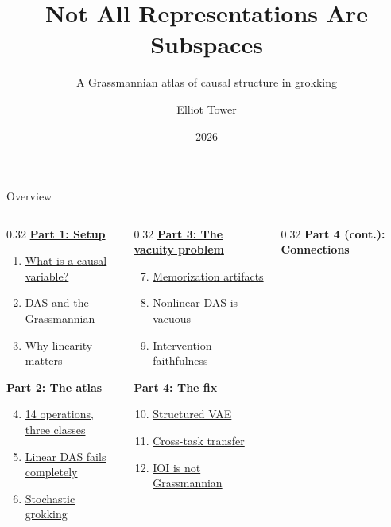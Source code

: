 \documentclass[aspectratio=169,11pt]{beamer}
\title{Not All Representations Are Subspaces}
\subtitle{A Grassmannian atlas of causal structure in grokking}
\author{Elliot Tower}
\date{2026}
\institute{}
\begin{document}
\maketitle

\begin{frame}{Overview}
\begin{columns}[T]
\begin{column}{0.32\textwidth}
\textbf{\hyperlink{part1}{Part 1: Setup}}
\begin{enumerate}
  \item \hyperlink{sec1}{What is a causal variable?}
  \item \hyperlink{sec2}{DAS and the Grassmannian}
  \item \hyperlink{sec3}{Why linearity matters}
\end{enumerate}
\vspace{0.5em}
\textbf{\hyperlink{part2}{Part 2: The atlas}}
\begin{enumerate}
  \setcounter{enumi}{3}
  \item \hyperlink{sec4}{14 operations, three classes}
  \item \hyperlink{sec5}{Linear DAS fails completely}
  \item \hyperlink{sec6}{Stochastic grokking}
\end{enumerate}
\end{column}
\begin{column}{0.32\textwidth}
\textbf{\hyperlink{part3}{Part 3: The vacuity problem}}
\begin{enumerate}
  \setcounter{enumi}{6}
  \item \hyperlink{sec7}{Memorization artifacts}
  \item \hyperlink{sec8}{Nonlinear DAS is vacuous}
  \item \hyperlink{sec9}{Intervention faithfulness}
\end{enumerate}
\vspace{0.5em}
\textbf{\hyperlink{part4}{Part 4: The fix}}
\begin{enumerate}
  \setcounter{enumi}{9}
  \item \hyperlink{sec10}{Structured VAE}
  \item \hyperlink{sec11}{Cross-task transfer}
  \item \hyperlink{sec12}{IOI is not Grassmannian}
\end{enumerate}
\end{column}
\begin{column}{0.32\textwidth}
\textbf{Part 4 (cont.): Connections}

\end{column}
\end{columns}
\end{frame}
\end{document}
